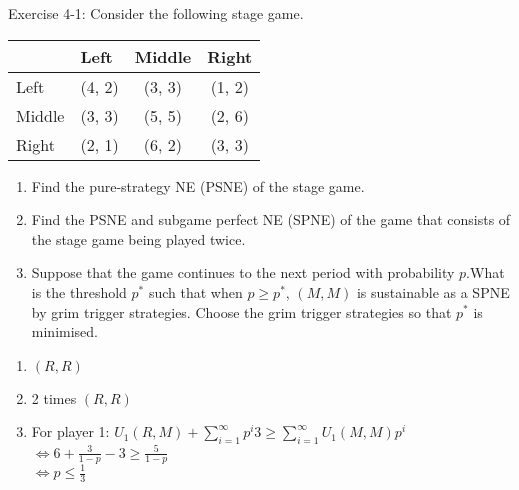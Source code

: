 \documentclass[../main.tex]{subfiles}
\begin{document}
\begin{question}
    Exercise 4-1: Consider the following stage game.
    \begin{table}[h]
    \centering
\begin{tabular}{lccc}
                            & \multicolumn{1}{l}{Left} & \multicolumn{1}{l}{Middle} & \multicolumn{1}{l}{Right} \\ \hline
\multicolumn{1}{l|}{Left}   & (4, 2)                   & (3, 3)                     & (1, 2)                    \\
\multicolumn{1}{l|}{Middle} & (3, 3)                   & (5, 5)                     & (2, 6)                    \\
\multicolumn{1}{l|}{Right}  & (2, 1)                   & (6, 2)                     & (3, 3)                   
\end{tabular}
\end{table}

\begin{enumerate}
  \item Find the pure-strategy NE (PSNE) of the stage game.
  \item Find the PSNE and subgame perfect NE (SPNE) of the game that consists of the stage game being played twice.
  \item Suppose that the game continues to the next period with probability $p$.What is the threshold $p^*$ such that when $p \geq p^*$, $(M,M)$ is sustainable as a SPNE by grim trigger strategies. Choose the grim trigger strategies so that $p^*$ is minimised.
\end{enumerate}

\end{question}

\begin{solution}

\begin{enumerate}
  \item $(R,R)$
  \item 2 times $(R,R)$
  \item For player 1:
$U_1 (R,M) + \sum\limits_{i=1}^{\infty} p^i 3 \geq \sum\limits_{i=1}^{\infty} U_1 (M,M) p^i$\\
$\Leftrightarrow 6 + \frac{3}{1-p} - 3 \geq \frac{5}{1-p}$\\
$\Leftrightarrow p \leq \frac{1}{3}$

\end{enumerate}

\end{solution}
\end{document}
